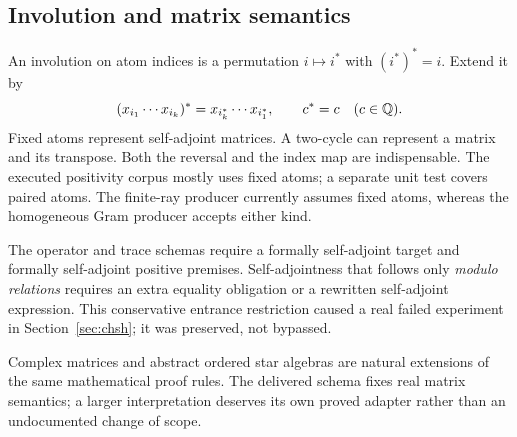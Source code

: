 \subsection{Involution and matrix semantics}

An involution on atom indices is a permutation $i\mapsto i^*$ with
$(i^*)^*=i$. Extend it by
\[
 (x_{i_1}\cdots x_{i_k})^*
   =x_{i_k^*}\cdots x_{i_1^*},\qquad c^*=c\quad(c\in\mathbb Q).
\]
Fixed atoms represent self-adjoint matrices. A two-cycle can represent a matrix
and its transpose. Both the reversal and the index map are indispensable. The
executed positivity corpus mostly uses fixed atoms; a separate unit test covers
paired atoms. The finite-ray producer currently assumes fixed atoms, whereas
the homogeneous Gram producer accepts either kind.

The operator and trace schemas require a formally self-adjoint target and
formally self-adjoint positive premises. Self-adjointness that follows only
\emph{modulo relations} requires an extra equality obligation or a rewritten
self-adjoint expression. This conservative entrance restriction caused a real
failed experiment in Section~\ref{sec:chsh}; it was preserved, not bypassed.

Complex matrices and abstract ordered star algebras are natural extensions of
the same mathematical proof rules. The delivered schema fixes real matrix
semantics; a larger interpretation deserves its own proved adapter rather than
an undocumented change of scope.
